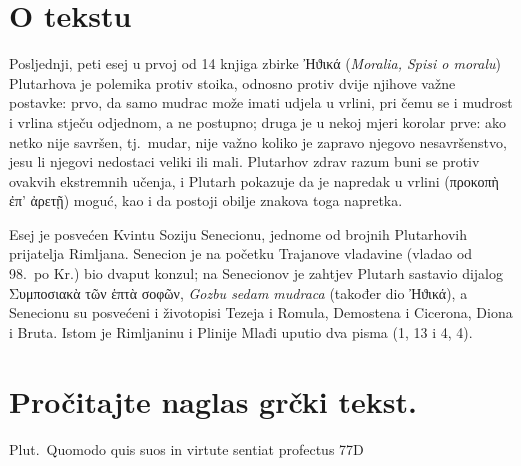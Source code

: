 


\section*{O tekstu}

Posljednji, peti esej u prvoj od 14 knjiga zbirke \textgreek[variant=ancient]{Ἠϑικά} (\textit{Moralia, Spisi o moralu}) Plutarhova je polemika protiv stoika, odnosno protiv dvije njihove važne postavke: prvo, da samo mudrac može imati udjela u vrlini, pri čemu se i mudrost i vrlina stječu odjednom, a ne postupno; druga je u nekoj mjeri korolar prve: ako netko nije savršen, tj.\ mudar, nije važno koliko je zapravo njegovo nesavršenstvo, jesu li njegovi nedostaci veliki ili mali. Plutarhov zdrav razum buni se protiv ovakvih ekstremnih učenja, i Plutarh pokazuje da je napredak u vrlini \textgreek[variant=ancient]{(προκοπὴ ἐπ' ἀρετῇ)} moguć, kao i da postoji obilje znakova toga napretka.

Esej je posvećen Kvintu Soziju Senecionu, jednome od brojnih Plutarhovih prijatelja Rimljana. Senecion je na početku Trajanove vladavine (vladao od 98.\ po Kr.) bio dvaput konzul; na Senecionov je zahtjev Plutarh sastavio dijalog \textgreek[variant=ancient]{Συμποσιακὰ τῶν ἑπτὰ σοφῶν,} \textit{Gozbu sedam mudraca} (također dio \textgreek[variant=ancient]{Ἠϑικά}), a Senecionu su posvećeni i životopisi Tezeja i Romula, Demostena i Cicerona, Diona i Bruta. Istom je Rimljaninu i Plinije Mlađi uputio dva pisma (1, 13 i 4, 4).


\section*{Pročitajte naglas grčki tekst.}

Plut.\ Quomodo quis suos in virtute sentiat profectus 77D


\medskip


